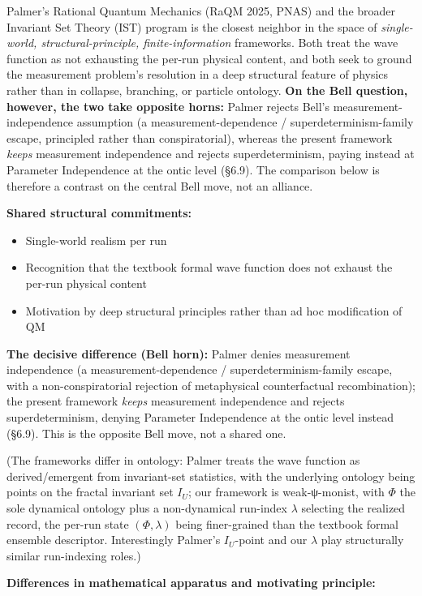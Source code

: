 \documentclass[11pt,a4paper]{article}
\begin{document}
Palmer's Rational Quantum Mechanics (RaQM 2025, PNAS) and the broader Invariant Set Theory (IST) program is the closest neighbor in the space of \emph{single-world, structural-principle, finite-information} frameworks. Both treat the wave function as not exhausting the per-run physical content, and both seek to ground the measurement problem's resolution in a deep structural feature of physics rather than in collapse, branching, or particle ontology. \textbf{On the Bell question, however, the two take opposite horns:} Palmer rejects Bell's measurement-independence assumption (a measurement-dependence / superdeterminism-family escape, principled rather than conspiratorial), whereas the present framework \emph{keeps} measurement independence and rejects superdeterminism, paying instead at Parameter Independence at the ontic level (§6.9). The comparison below is therefore a contrast on the central Bell move, not an alliance.

\textbf{Shared structural commitments:}
\begin{itemize}
  \item Single-world realism per run
  \item Recognition that the textbook formal wave function does not exhaust the per-run physical content
  \item Motivation by deep structural principles rather than ad hoc modification of QM
\end{itemize}

\textbf{The decisive difference (Bell horn):} Palmer denies measurement independence (a measurement-dependence / superdeterminism-family escape, with a non-conspiratorial rejection of metaphysical counterfactual recombination); the present framework \emph{keeps} measurement independence and rejects superdeterminism, denying Parameter Independence at the ontic level instead (§6.9). This is the opposite Bell move, not a shared one.

(The frameworks differ in ontology: Palmer treats the wave function as derived/emergent from invariant-set statistics, with the underlying ontology being points on the fractal invariant set $I_U$; our framework is weak-ψ-monist, with $\Phi$ the sole dynamical ontology plus a non-dynamical run-index $\lambda$ selecting the realized record, the per-run state $(\Phi,\lambda)$ being finer-grained than the textbook formal ensemble descriptor. Interestingly Palmer's $I_U$-point and our $\lambda$ play structurally similar run-indexing roles.)

\textbf{Differences in mathematical apparatus and motivating principle:}
\end{document}
